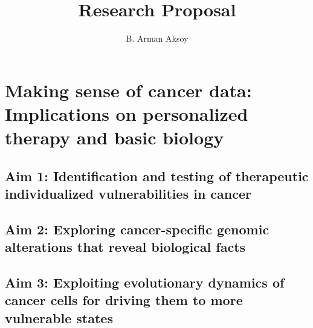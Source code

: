 \documentclass[12pt,letterpaper]{article}
\title{Research Proposal}
\author{B. Arman Aksoy}
\begin{document}
\maketitle

\section{Making sense of cancer data: Implications on personalized therapy and basic biology}

\subsection{Aim 1: Identification and testing of therapeutic individualized vulnerabilities in cancer}
\subsection{Aim 2: Exploring cancer-specific genomic alterations that reveal biological facts}
\subsection{Aim 3: Exploiting evolutionary dynamics of cancer cells for driving them to more vulnerable states}
\end{document}
